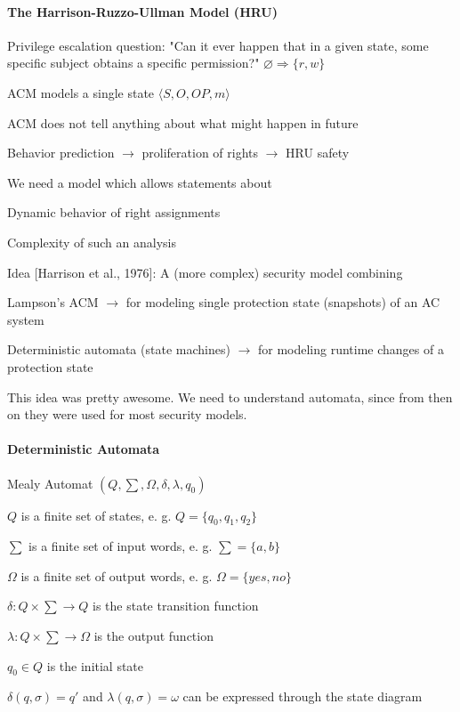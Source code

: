 \documentclass[a4paper]{article}
\begin{document}
\begin{multicols}{3}
    \paragraph{The Harrison-Ruzzo-Ullman Model (HRU)}

    Privilege escalation question: "Can it ever happen that in a given state, some specific subject obtains a specific permission?"
    $\varnothing \Rightarrow \{r,w\}$
    \begin{itemize*}
        \item ACM models a single state $\langle S,O,OP,m\rangle$
        \item ACM does not tell anything about what might happen in future
        \item Behavior prediction $\rightarrow$  proliferation of rights $\rightarrow$ HRU safety
    \end{itemize*}

    We need a model which allows statements about
    \begin{itemize*}
        \item Dynamic behavior of right assignments
        \item Complexity of such an analysis
    \end{itemize*}

    Idea [Harrison et al., 1976]: A (more complex) security model combining
    \begin{itemize*}
        \item Lampson’s ACM $\rightarrow$  for modeling single protection state (snapshots) of an AC system
        \item Deterministic automata (state machines) $\rightarrow$  for modeling runtime changes of a protection state
    \end{itemize*}

    This idea was pretty awesome. We need to understand automata, since from then on they were used for most security models.

    \paragraph{Deterministic Automata}
    Mealy Automat $(Q,\sum,\Omega,\delta,\lambda,q_0)$
    \begin{itemize*}
        \item $Q$ is a finite set of states, e. g. $Q=\{q_0 ,q_1 ,q_2\}$
        \item $\sum$ is a finite set of input words, e. g. $\sum=\{a,b\}$
        \item $\Omega$ is a finite set of output words, e. g. $\Omega=\{yes,no\}$
        \item $\delta:Q\times\sum\rightarrow Q$ is the state transition function
        \item $\lambda:Q\times\sum\rightarrow\Omega$ is the output function
        \item $q_0\in Q$ is the initial state
        \item $\delta(q,\sigma)=q'$ and $\lambda(q,\sigma)=\omega$ can be expressed through the state diagram
    \end{itemize*}


\end{multicols}
\end{document}
